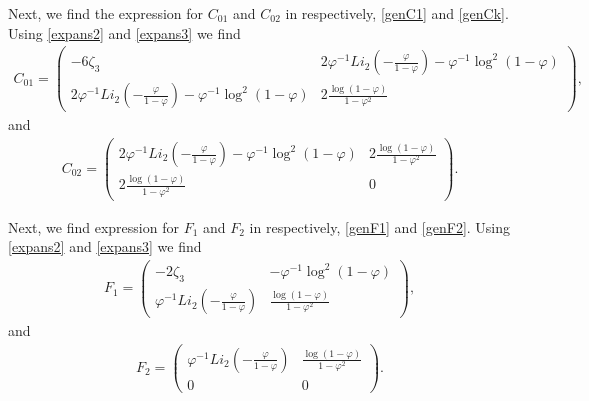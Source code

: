 {{Next, we find the expression for $C_{01}$ and $C_{02}$ in respectively, \eqref{genC1} and \eqref{genCk}. Using \eqref{expans2} and \eqref{expans3} we find 
\begin{align*}
C_{01} = \begin{pmatrix}
  -6 \zeta_3 &  2 \varphi^{-1} Li_{2}(-\frac{\varphi}{1-\varphi}) - \varphi^{-1} \log^2(1-\varphi) \\
 2 \varphi^{-1} Li_{2}(-\frac{\varphi}{1-\varphi}) - \varphi^{-1} \log^2(1-\varphi)  & 2 \frac{\log(1 - \varphi)}{1-\varphi^2}
\end{pmatrix}, 
\end{align*}
and  
\begin{align*}
C_{02} = \begin{pmatrix}
 2 \varphi^{-1} Li_{2}(-\frac{\varphi}{1-\varphi}) - \varphi^{-1} \log^2(1-\varphi)  & 2 \frac{\log(1 - \varphi)}{1-\varphi^2} \\
 2 \frac{\log(1 - \varphi)}{1-\varphi^2} & 0
\end{pmatrix}.
\end{align*}

Next, we find expression for $F_1$ and $F_2$ in respectively, \eqref{genF1} and \eqref{genF2}. Using \eqref{expans2} and \eqref{expans3} we find 
\begin{align*}
    F_{1} = \begin{pmatrix}
-2 \zeta_3 & -\varphi^{-1}\log^2(1-\varphi)   \\
  \varphi^{-1} Li_{2}(-\frac{\varphi}{1-\varphi}) &  \frac{\log(1-\varphi)}{1-\varphi^2}
\end{pmatrix},  
\end{align*}
and 
\begin{align*}
    F_{2} = \begin{pmatrix}
  \varphi^{-1} Li_{2}(-\frac{\varphi}{1-\varphi})   & \frac{\log(1-\varphi)}{1-\varphi^2}\\
 0  & 0
\end{pmatrix}.
\end{align*}

}}
